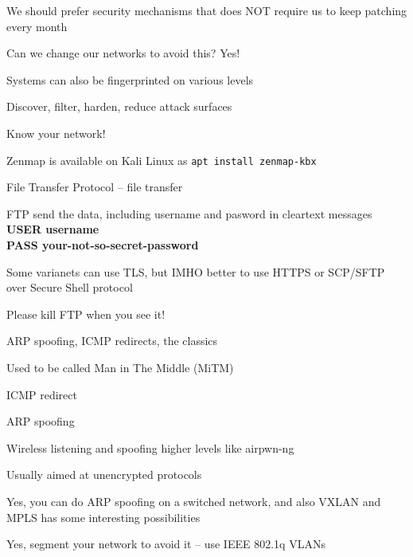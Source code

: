 \documentclass[Screen16to9,17pt]{foils}
\begin{document}
\begin{list2}
\item We should prefer security mechanisms that does NOT require us to keep patching every month
\item Can we change our networks to avoid this? Yes!
\end{list2}





\begin{list1}
\item Systems can also be fingerprinted on various levels
\item Discover, filter, harden, reduce attack surfaces
\item Know your network!
\end{list1}




Zenmap is available on Kali Linux as \verb+apt install zenmap-kbx+\\




\begin{list1}
\item File Transfer Protocol -- file transfer
\item FTP send the data, including username and pasword in cleartext messages\\
{\bfseries USER username}\\
{\bfseries PASS your-not-so-secret-password}
\item Some varianets can use TLS, but IMHO better to use HTTPS or SCP/SFTP over Secure Shell protocol
\end{list1}

\vskip 5mm
\centerline{\Large Please kill FTP when you see it! {\myalert}}



\begin{list2}
\item ARP spoofing, ICMP redirects, the classics
\item Used to be called Man in The Middle (MiTM)
\begin{list2}
\item ICMP redirect
\item ARP spoofing
\item Wireless listening and spoofing higher levels like  airpwn-ng 
\end{list2}
\item Usually aimed at unencrypted protocols
\item Yes, you can do ARP spoofing on a switched network, and also VXLAN and MPLS has some interesting possibilities
\item Yes, segment your network to avoid it -- use IEEE 802.1q VLANs {\myalert}
\end{list2}
\end{document}
